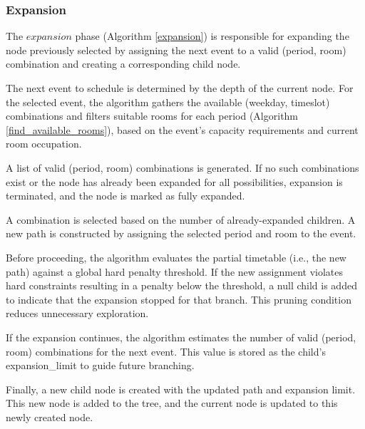 \subsubsection{Expansion}

The \(expansion\) phase (Algorithm \ref{expansion}) is responsible for expanding the node previously selected by assigning the next event to a valid (period, room) combination and creating a corresponding child node.

The next event to schedule is determined by the depth of the current node. For the selected event, the algorithm gathers the available (weekday, timeslot) combinations and filters suitable rooms for each period (Algorithm \ref{find_available_rooms}), based on the event’s capacity requirements and current room occupation.

A list of valid (period, room) combinations is generated. If no such combinations exist or the node has already been expanded for all possibilities, expansion is terminated, and the node is marked as fully expanded.  

A combination is selected based on the number of already-expanded children. A new path is constructed by assigning the selected period and room to the event.

Before proceeding, the algorithm evaluates the partial timetable (i.e., the new path) against a global hard penalty threshold. If the new assignment violates hard constraints resulting in a penalty below the threshold, a null child is added to indicate that the expansion stopped for that branch. This pruning condition reduces unnecessary exploration.

If the expansion continues, the algorithm estimates the number of valid (period, room) combinations for the next event. This value is stored as the child’s expansion\_limit to guide future branching.

Finally, a new child node is created with the updated path and expansion limit. This new node is added to the tree, and the current node is updated to this newly created node.


